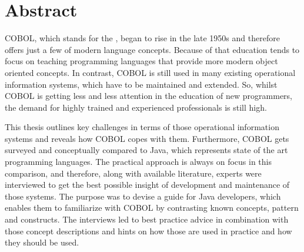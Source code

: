 \chapter*{Abstract} 

COBOL, which stands for the , began to rise in the late 1950s and therefore offers just a few of modern language concepts. Because of that education tends to focus on teaching programming languages that provide more modern object oriented concepts. In contrast, COBOL is still used in many existing operational information systems, which have to be maintained and extended. So, whilst COBOL is getting less and less attention in the education of new programmers, the demand for highly trained and experienced professionals is still high. 

This thesis outlines key challenges in terms of those operational information systems and reveals how COBOL copes with them. Furthermore, COBOL gets surveyed and conceptually compared to Java, which represents state of the art programming languages. The practical approach is always on focus in this comparison, and therefore, along with available literature, experts were interviewed to get the best possible insight of development and maintenance of those systems. The purpose was to devise a guide for Java developers, which enables them to familiarize with COBOL by contrasting known concepts, pattern and constructs. The interviews led to best practice advice in combination with those concept descriptions and hints on how those are used in practice and how they should be used.